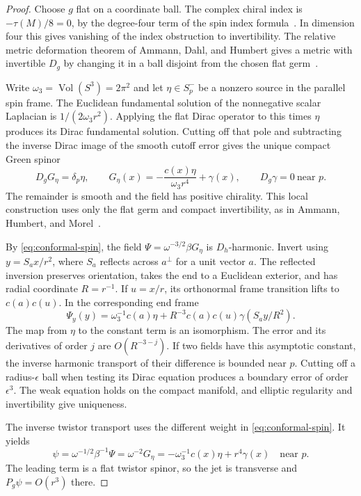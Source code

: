 \documentclass[11pt]{article}
\numberwithin{equation}{section}
\DeclareMathOperator{\Vol}{Vol}
\begin{document}
\begin{proof}
Choose \(g\) flat on a coordinate ball. The complex chiral index is
\(-\tau(M)/8=0\), by the degree-four term of the spin index
formula~\cite{AtiyahSinger1963Index}. In dimension four this gives
vanishing of the index obstruction to invertibility. The relative
metric deformation theorem of Ammann, Dahl, and Humbert gives a metric
with invertible \(D_g\) by changing it in a ball disjoint from the chosen
flat germ~\cite[Theorem~1.1]{AmmannDahlHumbert2011Local}.

Write \(\omega_3=\Vol(S^3)=2\pi^2\) and let
\(\eta\in S^-_p\) be a nonzero source in the parallel spin frame.
The Euclidean fundamental solution of the nonnegative scalar Laplacian
is \(1/(2\omega_3 r^2)\). Applying the flat Dirac operator to this
times \(\eta\) produces its Dirac fundamental solution. Cutting off
that pole and subtracting the inverse Dirac image of the smooth
cutoff error gives the unique compact Green spinor
\begin{equation}\label{eq:green-pole}
 D_gG_\eta=\delta_p\eta,\qquad
 G_\eta(x)=-\frac{c(x)\eta}{\omega_3 r^4}+\gamma(x),
 \qquad D_g\gamma=0\ \text{near }p .
\end{equation}
The remainder is smooth and the field has positive chirality.
This local construction uses only the flat germ and compact
invertibility, as in Ammann, Humbert, and Morel~\cite[\S2]{AmmannHumbertMorel2006Mass}.

By \eqref{eq:conformal-spin}, the field
\(\Psi=\omega^{-3/2}\beta G_\eta\) is \(D_h\)-harmonic. Invert using
\(y=S_a x/r^2\), where \(S_a\) reflects across \(a^\perp\) for a unit vector
\(a\). The reflected inversion preserves orientation, takes the end
to a Euclidean exterior, and has radial coordinate \(R=r^{-1}\).
If \(u=x/r\), its orthonormal frame transition lifts to \(c(a)c(u)\).
In the corresponding end frame
\begin{equation}\label{eq:green-end}
 \Psi_y(y)=\omega_3^{-1}c(a)\eta+
    R^{-3}c(a)c(u)\gamma(S_a y/R^2).
\end{equation}
The map from \(\eta\) to the constant term is an isomorphism. The
error and its derivatives of order \(j\) are \(O(R^{-3-j})\).
If two fields have this asymptotic constant, the inverse harmonic
transport of their difference is bounded near \(p\). Cutting off
a radius-\(\epsilon\) ball when testing its Dirac equation produces
a boundary error of order \(\epsilon^3\). The weak equation holds on
the compact manifold, and elliptic regularity and invertibility give
uniqueness.

The inverse twistor transport uses the different weight in
\eqref{eq:conformal-spin}. It yields
\begin{equation}\label{eq:green-jet}
 \psi=\omega^{-1/2}\beta^{-1}\Psi=\omega^{-2}G_\eta
       =-\omega_3^{-1}c(x)\eta+r^4\gamma(x)
       \quad\text{near }p .
\end{equation}
The leading term is a flat twistor spinor, so the jet is transverse
and \(P_g\psi=O(r^3)\) there.
\end{proof}
\end{document}
